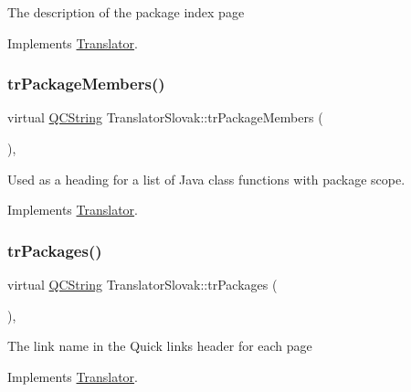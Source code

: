 The description of the package index page 

Implements \mbox{\hyperlink{class_translator}{Translator}}.

\mbox{\label{class_translator_slovak_a52c24235372528bd1b98f8ddd80e1d1d}} 
\subsubsection{\texorpdfstring{trPackageMembers()}{trPackageMembers()}}
{\footnotesize\ttfamily virtual \mbox{\hyperlink{class_q_c_string}{Q\+C\+String}} Translator\+Slovak\+::tr\+Package\+Members (\begin{DoxyParamCaption}{ }\end{DoxyParamCaption})\hspace{0.3cm}{\ttfamily [inline]}, {\ttfamily [virtual]}}

Used as a heading for a list of Java class functions with package scope. 

Implements \mbox{\hyperlink{class_translator}{Translator}}.

\mbox{\label{class_translator_slovak_ac14023e99d6554697b2e80a8a6362f98}} 
\subsubsection{\texorpdfstring{trPackages()}{trPackages()}}
{\footnotesize\ttfamily virtual \mbox{\hyperlink{class_q_c_string}{Q\+C\+String}} Translator\+Slovak\+::tr\+Packages (\begin{DoxyParamCaption}{ }\end{DoxyParamCaption})\hspace{0.3cm}{\ttfamily [inline]}, {\ttfamily [virtual]}}

The link name in the Quick links header for each page 

Implements \mbox{\hyperlink{class_translator}{Translator}}.

\mbox{\label{class_translator_slovak_a3b049734d78df2c2b5851d986e066aea}} 
